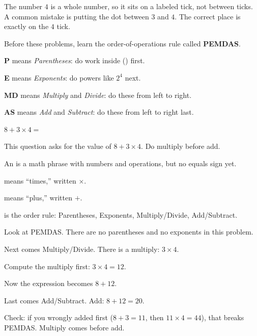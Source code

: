 

The number $4$ is a whole number, so it sits on a labeled tick, not between
ticks. A common mistake is putting the dot between $3$ and $4$. The correct place
is exactly on the $4$ tick.


\noindent Before these problems, learn the order-of-operations rule called \textbf{PEMDAS}.

\begin{words}
  \item \textbf{P} means \textit{Parentheses}: do work inside (\;) first.
  \item \textbf{E} means \textit{Exponents}: do powers like $2^{4}$ next.
  \item \textbf{MD} means \textit{Multiply} and \textit{Divide}: do these from left to right.
  \item \textbf{AS} means \textit{Add} and \textit{Subtract}: do these from left to right last.
\end{words}


$8 + 3 \times 4 = $\ansblank


This question asks for the value of $8 + 3 \times 4$. Do multiply before add.

\begin{words}
  \item An is a math phrase with numbers and operations, but no equals sign yet.
  \item {}means ``times,'' written $\times$.
  \item {}means ``plus,'' written $+$.
  \item {}is the order rule: Parentheses, Exponents, Multiply/Divide, Add/Subtract.
\end{words}

\begin{steps}
  \item Look at PEMDAS. There are no parentheses and no exponents in this problem.
  \item Next comes Multiply/Divide. There is a multiply: $3 \times 4$.
  \item Compute the multiply first: $3 \times 4 = 12$.
  \item Now the expression becomes $8 + 12$.
  \item Last comes Add/Subtract. Add: $8 + 12 = 20$.
  \item Check: if you wrongly added first ($8 + 3 = 11$, then $11 \times 4 = 44$),
        that breaks PEMDAS. Multiply comes before add.
\end{steps}

